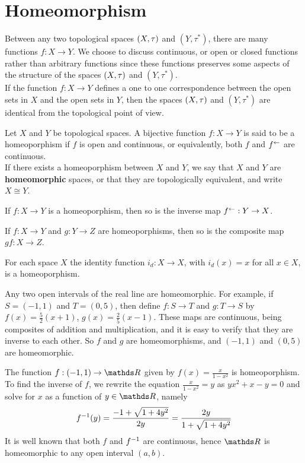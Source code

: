 \documentclass[../main-sheet.tex]{subfiles}
\begin{document}
\section{Homeomorphism}
Between any two topological spaces \((X, \tau)\) and \((Y,\tau^{*})\), there are many functions \(f:X\to Y\). We choose to discuss continuous, or open or closed functions rather than arbitrary functions since these functions preserves some aspects of the structure of the spaces \((X, \tau)\) and \((Y,\tau^{*})\).\\
If the function \(f:X\to Y\) defines a one to one correspondence between the open sets in \(X\) and the open sets in \(Y\), then the spaces \((X, \tau)\) and \((Y,\tau^{*})\) are identical from the topological point of view.
\begin{defn}
    Let \(X \) and \(Y\) be topological spaces. A bijective function \(f:X\to Y\) is said to be a homeoporphism if \(f\) is open and continuous, or equivalently, both \(f\) and \(f^{\leftarrow}\) are continuous.\\
    If there exists a homeoporphism between \(X\) and \(Y\), we say that \(X\) and \(Y\) are \textbf{homeomorphic} spaces, or that they are topologically equivalent, and write \(X\cong Y\).
\end{defn}
\begin{lem}
    If \(f:X\to Y\) is a homeoporphism, then so is the inverse map \(f^{\leftarrow}:Y\to X\).
\end{lem}
\begin{lem}
    If \(f:X\to Y\) and \(g:Y\to Z\) are homeoporphisms, then so is the composite map \(gf:X\to Z\).
\end{lem}
\begin{ex}
    For each space \(X\) the identity function \(i_d:X\to X\), with \(i_d(x)=x\) for all \(x\in X\), is a homeoporphism.
\end{ex}
\begin{ex}
    Any two open intervals of the real line are homeomorphic. For example, if \(S=(-1,1)\) and \(T=(0,5)\), then define \(f:S\to T\) and \(g:T\to S\) by \(f(x)=\frac{5}{2}(x+1)\), \(g(x)=\frac{2}{5}(x-1)\). These maps are continuous, being composites of addition and multiplication, and it is easy to verify that they are inverse to each other. So \(f\) and \(g\) are homeomorphisms, and \((-1,1)\) and \((0,5)\) are homeomorphic.
\end{ex}
\begin{ex}
    The function \(f:(-1,1)\to\R\) given by \(f(x)=\frac{x}{1-x^2}\) is homeoporphism. To find the inverse of \(f\), we rewrite the equation \(\frac{x}{1-x^2}=y\) as \(yx^2+x-y=0\) and solve for \(x\) as a function of \(y\in \R\), namely
    \[f^{-1}(y)=\frac{-1+\sqrt{1+4y^2}}{2y}=\frac{2y}{1+\sqrt{1+4y^2}}\]
    It is well known that both \(f\) and \(f^{-1}\) are continuous, hence \(\R\) is homeomorphic to any open interval \((a,b)\).
\end{ex}
\end{document}
